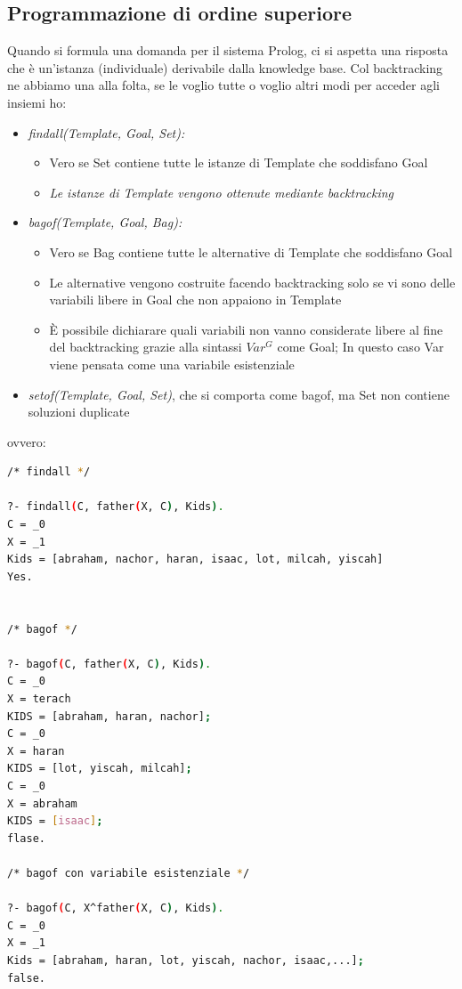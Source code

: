 \documentclass[a4paper,12pt, oneside]{book}
\begin{document}
\subsection{Programmazione di ordine superiore}
Quando si formula una domanda per il sistema Prolog, ci si
aspetta una risposta che è un'istanza (individuale) derivabile dalla knowledge base. Col backtracking ne abbiamo una alla folta, se le voglio tutte o voglio altri modi per acceder agli insiemi ho:
\begin{itemize}
\item \textit{findall(Template, Goal, Set):} 
\begin{itemize}
\item Vero se Set contiene tutte le istanze di Template che soddisfano Goal
\item \textit{Le istanze di Template vengono ottenute mediante backtracking}
\end{itemize}
\item \textit{bagof(Template, Goal, Bag):}
\begin{itemize}
\item Vero se Bag contiene tutte le alternative di Template che soddisfano Goal
\item Le alternative vengono costruite facendo backtracking solo se vi sono delle variabili libere in Goal che non appaiono in Template
\item È possibile dichiarare quali variabili non vanno considerate libere al fine del backtracking grazie alla sintassi $Var^G$ come Goal; In questo caso Var viene pensata come una variabile esistenziale
\end{itemize}
\item \textit{setof(Template, Goal, Set)}, che si comporta come bagof, ma Set non contiene soluzioni duplicate
\end{itemize}
\newpage
ovvero:
\begin{shaded}
\begin{lstlisting}[language=bash]
/* findall */

?- findall(C, father(X, C), Kids).
C = _0
X = _1
Kids = [abraham, nachor, haran, isaac, lot, milcah, yiscah]
Yes.


/* bagof */

?- bagof(C, father(X, C), Kids).
C = _0
X = terach
KIDS = [abraham, haran, nachor];
C = _0
X = haran
KIDS = [lot, yiscah, milcah];
C = _0
X = abraham
KIDS = [isaac];
flase.

/* bagof con variabile esistenziale */

?- bagof(C, X^father(X, C), Kids).
C = _0
X = _1
Kids = [abraham, haran, lot, yiscah, nachor, isaac,...];
false.
\end{lstlisting}
\end{shaded}
\newpage
\end{document}
